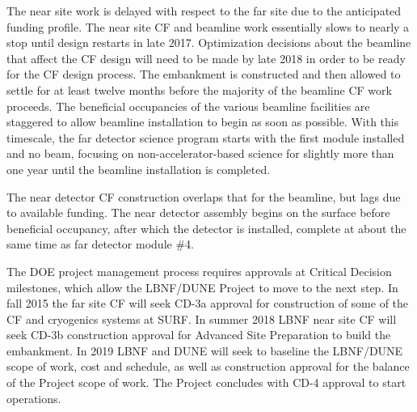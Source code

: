 The near site work is delayed with respect to the far site due to the anticipated funding profile. The near site CF and beamline work essentially slows to nearly a stop 
until design restarts in late 2017. Optimization decisions about the beamline that affect the CF design will need to be made by late 2018 in order to be ready for the CF design process. The embankment is constructed and then allowed to settle for at least twelve months before the majority of the beamline CF work proceeds. The beneficial occupancies of the various beamline facilities  
are staggered to allow beamline installation to begin as soon as possible. With this timescale, the far detector science program  
starts with the first module installed and no beam, focusing on non-accelerator-based science  
for slightly more than one year until 
the beamline installation is completed.


The near detector CF construction overlaps that for the beamline, but lags due to available funding. The near detector assembly begins on the surface before beneficial occupancy, after which the detector is installed, complete at about the same time as far detector module \#4. 

The DOE project management process requires approvals at Critical Decision milestones, which allow the LBNF/DUNE Project to move to the next step. In fall 2015 the far site CF will seek CD-3a approval for construction of some of the CF and cryogenics systems at SURF. In summer 2018 LBNF near site CF will seek CD-3b construction approval for Advanced Site Preparation to build the embankment. In 2019  LBNF and DUNE will seek to baseline the LBNF/DUNE scope of work, cost and schedule, as well as construction approval for the balance of the Project scope of work. 
The Project concludes with CD-4 approval to start operations.

